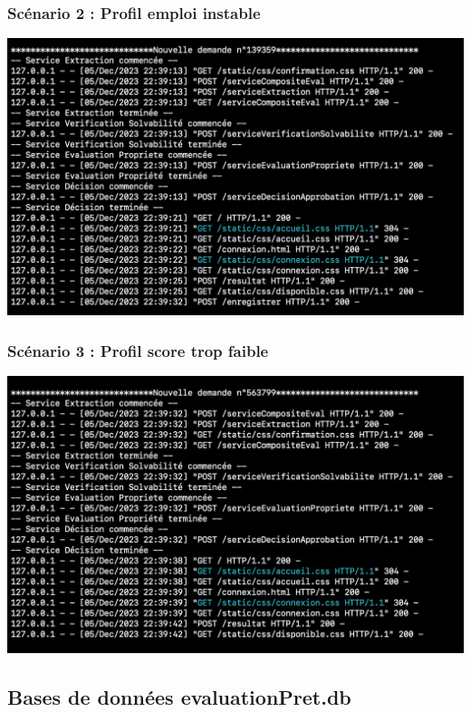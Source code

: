 \documentclass{article}
\begin{document}
    \subsubsection{Scénario 2 : Profil emploi instable}
    \includegraphics[width=400pt]{Images/12.4/serveur2.png}\\
    
    \newpage
    
    \subsubsection{Scénario 3 : Profil score trop faible}
    \includegraphics[width=400pt]{Images/12.4/serveur3.png}

    \subsection{Bases de données evaluationPret.db}
\end{document}
